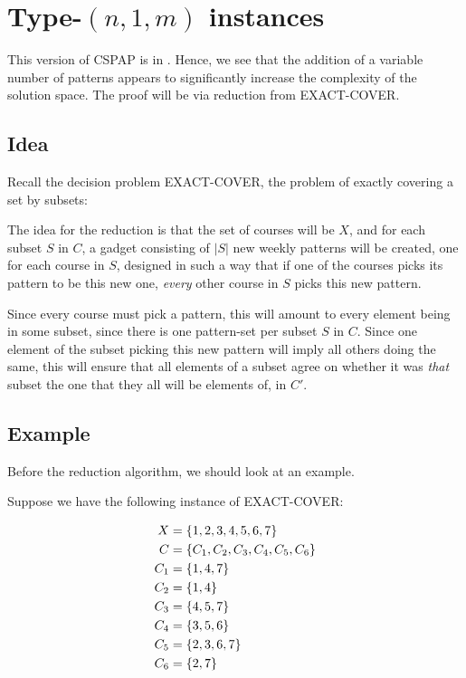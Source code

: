 \section{Type-$(n, 1, m)$ instances}

This version of CSPAP is in \nph. Hence, we see that the addition of a variable number of patterns appears to significantly increase the complexity of the solution space. The proof will be via reduction from EXACT-COVER.

\subsection{Idea}
Recall the decision problem EXACT-COVER, the problem of exactly covering a set by subsets:


The idea for the reduction is that the set of courses will be $X$, and for each subset $S$ in $C$, a gadget consisting of $|S|$ new weekly patterns will be created, one for each course in $S$, designed in such a way that if one of the courses picks its pattern to be this new one, \emph{every} other course in $S$ picks this new pattern.

Since every course must pick a pattern, this will amount to every element being in some subset, since there is one pattern-set per subset $S$ in $C$. Since one element of the subset picking this new pattern will imply all others doing the same, this will ensure that all elements of a subset agree on whether it was \emph{that} subset the one that they all will be elements of, in $C'$.

\subsection{Example}
Before the reduction algorithm, we should look at an example.

Suppose we have the following instance of EXACT-COVER:

\begin{align*}
X &= \{1, 2, 3, 4, 5, 6, 7\}\\
C &= \{{\color{BrickRed}C_1}, {\color{NavyBlue}C_2}, {\color{Fuchsia}C_3}, {\color{ForestGreen}C_4}, {\color{BurntOrange}C_5}, {\color{Tan}C_6}\}\\
{\color{BrickRed} C_1} &= {\color{BrickRed} \{1, 4, 7\}}\\
{\color{NavyBlue} C_2} &= {\color{NavyBlue}\{ 1, 4 \} }\\
{\color{Fuchsia} C_3} &= {\color{Fuchsia} \{ 4, 5, 7\} }\\
{\color{ForestGreen} C_4} &= {\color{ForestGreen} \{ 3, 5, 6\} }\\
{\color{BurntOrange} C_5} &= {\color{BurntOrange} \{ 2, 3, 6, 7 \}}\\
{\color{Tan} C_6} &= {\color{Tan} \{2, 7\}}
\end{align*}

